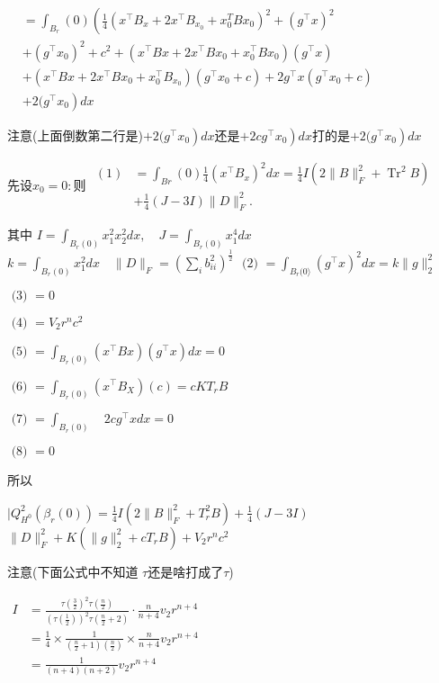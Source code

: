 \documentclass[UTF8]{ctexart}
\begin{document}
\(
\begin{aligned}
&=\int_{B_{r}}(0)\left(\frac{1}{4}\left(x^{\top} B_{x}+2 x^{\top} B_{x_{0}}+x_{0}^{T} B x_{0}\right)^{2}+\left(g^{\top} x\right)^{2}\right.\\
&+\left(g^{\top} x_{0}\right)^{2}+c^{2} +\left(x^{\top} B x+2 x^{\top} B x_{0}+x_{0}^{\top} B x_{0}\right)\left(g^{\top} x\right)\\
&+\left(x^{\top} B x+2 x^{\top} B x_{0}+x_{0}^{\top} B_{x_{0}}\right)\left(g^{\top} x_{0}+c\right)+2 g^{\top} x\left(g^{\top} x_{0}+c\right)\\
&\left.+2(g^{\top} x_{0}\right) dx
\end{aligned}
\)

注意(上面倒数第二行是)$\left.+2( g^{\top} x_{0}\right) dx$还是$\left.+2cg^{\top} x_{0}\right) dx$打的是$\left.+2( g^{\top} x_{0}\right) dx$

先设$x_{0}=0:$则
\(
\begin{aligned}
(1) &=\int_{B r}(0) \frac{1}{4}\left(x^{\top} B_{x}\right)^{2} d x=\frac{1}{4} I\left(2\|B\|_{F}^{2}+\operatorname{Tr}^{2} B\right) \\
&+\frac{1}{4}(J-3 I)\|D\|_{F}^{2} .
\end{aligned}
\)

其中
\(
I=\int_{B_{r}(0)} x_{1}^{2} x_{2}^{2} d x, \quad J=\int_{B_{r}(0)} x_{1}^{4} d x
\)
\(
k=\int_{B_{r}(0)} x_{1}^{2} d x \quad\|D\|_{F}=\left(\sum_{i} b_{i i}^{2}\right)^{\frac{1}{2}}
\)
\(
\text { (2) }=\int_{B_{r}(0\rangle}\left(g^{\top} x\right)^{2} d x=k\|g\|_{2}^{2}
\)

$\text { (3) }=0$

$\text { (4) }=V_{2} r^{n} c^{2}$

$\text { (5) }=\int_{B_{r}(0)}\left(x^{\top} B x\right)\left(g^{\top} x\right) d x=0$

$\text { (6) }=\int_{B_{r} (0) }\left(x^{\top} B_{X}\right)(c)=c K T_{r}B$

$\text { (7) }=\int_{B_{r}(0) }\quad 2cg^{\top} xdx=0$

$\text { (8) }=0$


所以

\(
\mid Q_{H^{0}}^{2}\left(\beta_{r}(0)\right)=\frac{1}{4} I\left(2\|B\|_{F}^{2}+T_{r}^{2} B\right)+\frac{1}{4}(J-3 I)
\)
\(
\|D\|_{F}^{2}+K\left(\|g\|_{2}^{2}+cT_{r} B\right)+V_{2} r^{n} c^{2}
\)

注意(下面公式中不知道 $\tau$还是啥打成了$\tau$)




\(
\begin{aligned}
I &=\frac{\tau\left(\frac{3}{2}\right)^{2} \tau\left(\frac{n}{2}\right)}{\left(\tau\left(\frac{1}{2}\right)\right)^{2} \tau\left(\frac{n}{2}+2\right)} \cdot \frac{n}{n+4} v_{2} r^{n+4} \\
&=\frac{1}{4} \times \frac{1}{\left(\frac{n}{2}+1\right)\left(\frac{n}{2}\right)} \times \frac{n}{n+4} v_{2} r^{n+4} \\
&=\frac{1}{(n+4)(n+2)} v_{2} r^{n+4}
\end{aligned}
\)
\end{document}
